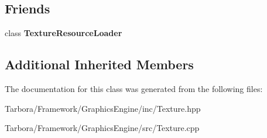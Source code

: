 \subsection*{Friends}
\begin{DoxyCompactItemize}
\item 
\mbox{\label{classTarbora_1_1Texture_a2894731fd152f0c4cbf3185a7212b8b7}} 
class {\bfseries Texture\+Resource\+Loader}
\end{DoxyCompactItemize}
\subsection*{Additional Inherited Members}


The documentation for this class was generated from the following files\+:\begin{DoxyCompactItemize}
\item 
Tarbora/\+Framework/\+Graphics\+Engine/inc/Texture.\+hpp\item 
Tarbora/\+Framework/\+Graphics\+Engine/src/Texture.\+cpp\end{DoxyCompactItemize}
